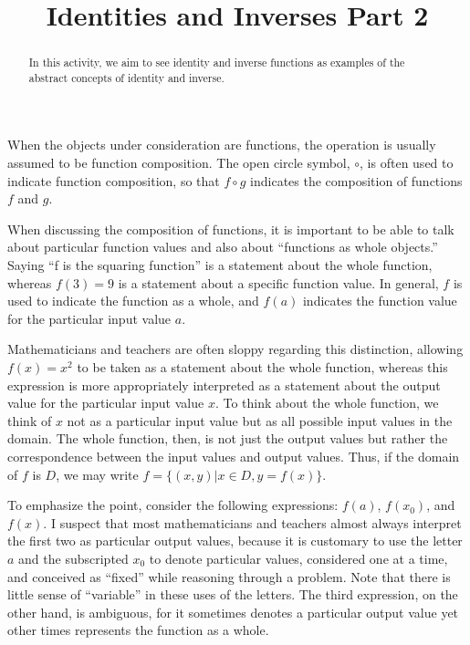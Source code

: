 \documentclass{ximera}
\title{Identities and Inverses Part 2}
\begin{document}
\begin{abstract}
In this activity, we aim to see identity and inverse functions as examples of the abstract concepts of identity and inverse.    
\end{abstract}
\maketitle


%
%

When the objects under consideration are functions, the operation is usually assumed to be function composition.  The open circle symbol, $\circ$, is often used to indicate function composition, so that $f\circ g$  indicates the composition of functions $f$ and $g$.  

When discussing the composition of functions, it is important to be able to talk about particular function values and also about ``functions as whole objects.''  Saying ``f is the squaring function'' is a statement about the whole function, whereas $f(3) = 9$ is a statement about a specific function value.  In general, $f$ is used to indicate the function as a whole, and $f(a)$ indicates the function value for the particular input value $a$.  

Mathematicians and teachers are often sloppy regarding this distinction, allowing $f(x)=x^2$ to be taken as a statement about the whole function, whereas this expression is more appropriately interpreted as a statement about the output value for the particular input value $x$.  To think about the whole function, we think of $x$ not as a particular input value but as all possible input values in the domain.  The whole function, then, is not just the output values but rather the correspondence between the input values and output values.  Thus, if the domain of $f$ is $D$, we may write $f=\{(x,y) | x\in D, y=f(x)\}$.
  
To emphasize the point, consider the following expressions:  $f(a)$, $f(x_0)$, and $f(x)$.  I suspect that most mathematicians and teachers almost always interpret the first two as particular output values, because it is customary to use the letter $a$ and the subscripted $x_0$ to denote particular values, considered one at a time, and conceived as ``fixed'' while reasoning through a problem.  Note that there is little sense of ``variable'' in these uses of the letters.  The third expression, on the other hand, is ambiguous, for it sometimes denotes a particular output value yet other times represents the function as a whole.  
\end{document}
